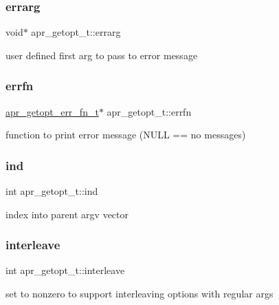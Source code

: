 \subsubsection{\texorpdfstring{errarg}{errarg}}
{\footnotesize\ttfamily void$\ast$ apr\+\_\+getopt\+\_\+t\+::errarg}

user defined first arg to pass to error message \mbox{\label{structapr__getopt__t_a6bf3fd7ad92d1f0161cd895e1ad50d06}} 
\subsubsection{\texorpdfstring{errfn}{errfn}}
{\footnotesize\ttfamily \mbox{\hyperlink{group__apr__getopt_gad0f6c9baec81bc84293e0f1e2262656e}{apr\+\_\+getopt\+\_\+err\+\_\+fn\+\_\+t}}$\ast$ apr\+\_\+getopt\+\_\+t\+::errfn}

function to print error message (N\+U\+LL == no messages) \mbox{\label{structapr__getopt__t_ab04d49d670f095c3244dc9792b70ff07}} 
\subsubsection{\texorpdfstring{ind}{ind}}
{\footnotesize\ttfamily int apr\+\_\+getopt\+\_\+t\+::ind}

index into parent argv vector \mbox{\label{structapr__getopt__t_a771dbef87345c731845dd63723fb34db}} 
\subsubsection{\texorpdfstring{interleave}{interleave}}
{\footnotesize\ttfamily int apr\+\_\+getopt\+\_\+t\+::interleave}

set to nonzero to support interleaving options with regular args \mbox{\label{structapr__getopt__t_a4f842391b8f8f19e562584fdd29d0654}} 
